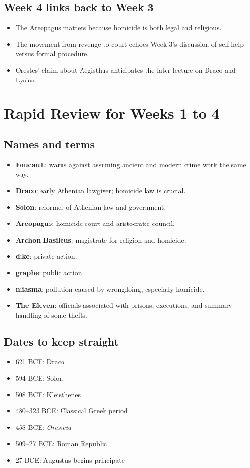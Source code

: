 \documentclass[11pt]{article}
\newcommand{\keyterm}[1]{\textbf{#1}}
\begin{document}
\subsection*{Week 4 links back to Week 3}
\begin{itemize}
\item The Areopagus matters because homicide is both legal and religious.
\item The movement from revenge to court echoes Week 3's discussion of self-help versus formal procedure.
\item Orestes' claim about Aegisthus anticipates the later lecture on Draco and Lysias.
\end{itemize}

\section{Rapid Review for Weeks 1 to 4}

\subsection*{Names and terms}
\begin{itemize}
\item \keyterm{Foucault}: warns against assuming ancient and modern crime work the same way.
\item \keyterm{Draco}: early Athenian lawgiver; homicide law is crucial.
\item \keyterm{Solon}: reformer of Athenian law and government.
\item \keyterm{Areopagus}: homicide court and aristocratic council.
\item \keyterm{Archon Basileus}: magistrate for religion and homicide.
\item \keyterm{dike}: private action.
\item \keyterm{graphe}: public action.
\item \keyterm{miasma}: pollution caused by wrongdoing, especially homicide.
\item \keyterm{The Eleven}: officials associated with prisons, executions, and summary handling of some thefts.
\end{itemize}

\subsection*{Dates to keep straight}
\begin{itemize}
\item 621 BCE: Draco
\item 594 BCE: Solon
\item 508 BCE: Kleisthenes
\item 480--323 BCE: Classical Greek period
\item 458 BCE: \textit{Oresteia}
\item 509--27 BCE: Roman Republic
\item 27 BCE: Augustus begins principate
\end{itemize}
\end{document}
